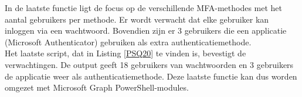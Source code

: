 In de laatste functie ligt de focus op de verschillende \ac{MFA}-methodes met het aantal gebruikers per methode. Er wordt verwacht dat elke gebruiker kan inloggen via een wachtwoord. Bovendien zijn er 3 gebruikers die een applicatie (Microsoft Authenticator) gebruiken als extra authenticatiemethode. \\

Het laatste script, dat in Listing \ref{PSQ20} te vinden is, bevestigt de verwachtingen. De output geeft 18 gebruikers van wachtwoorden en 3 gebruikers de applicatie weer als authenticatiemethode. Deze laatste functie kan dus worden omgezet met 
Microsoft Graph PowerShell-modules.